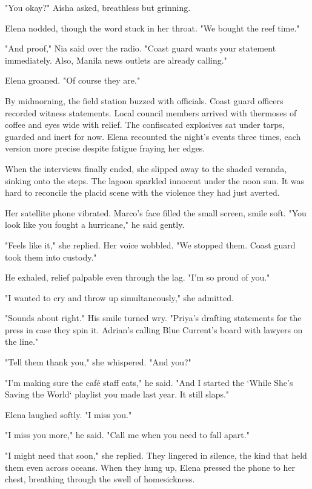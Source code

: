 "You okay?" Aisha asked, breathless but grinning.

Elena nodded, though the word stuck in her throat. "We bought the reef time."

"And proof," Nia said over the radio. "Coast guard wants your statement immediately. Also, Manila news outlets are already calling."

Elena groaned. "Of course they are."

\bigskip

By midmorning, the field station buzzed with officials. Coast guard officers recorded witness statements. Local council members arrived with thermoses of coffee and eyes wide with relief. The confiscated explosives sat under tarps, guarded and inert for now. Elena recounted the night's events three times, each version more precise despite fatigue fraying her edges.

When the interviews finally ended, she slipped away to the shaded veranda, sinking onto the steps. The lagoon sparkled innocent under the noon sun. It was hard to reconcile the placid scene with the violence they had just averted.

Her satellite phone vibrated. Marco's face filled the small screen, smile soft. "You look like you fought a hurricane," he said gently.

"Feels like it," she replied. Her voice wobbled. "We stopped them. Coast guard took them into custody."

He exhaled, relief palpable even through the lag. "I'm so proud of you."

"I wanted to cry and throw up simultaneously," she admitted.

"Sounds about right." His smile turned wry. "Priya's drafting statements for the press in case they spin it. Adrian's calling Blue Current's board with lawyers on the line."

"Tell them thank you," she whispered. "And you?"

"I'm making sure the café staff eats," he said. "And I started the `While She's Saving the World` playlist you made last year. It still slaps."

Elena laughed softly. "I miss you."

"I miss you more," he said. "Call me when you need to fall apart."

"I might need that soon," she replied. They lingered in silence, the kind that held them even across oceans. When they hung up, Elena pressed the phone to her chest, breathing through the swell of homesickness.

